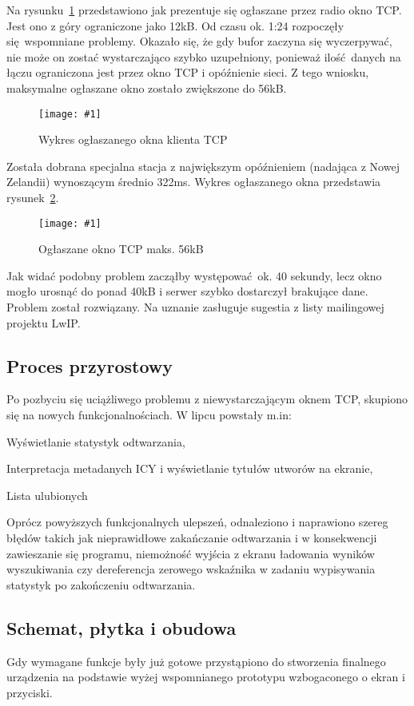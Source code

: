 \documentclass[polish]{aghengthesis}
\let\tempone\itemize
\let\temptwo\enditemize
\renewenvironment{itemize}{\tempone\setlength{\itemsep}{0cm}}{\temptwo}
\newcommand{\imgint}[4]{
	\begin{figure}[{#4}]
		\centering
		\texttt{[image: \#1]}
		\caption{#2}
		\label{#1}
	\end{figure}
}
\newcommand{\imgh}[3]{\imgint{#1}{#2}{#3}{H}}
\begin{document}
			Na rysunku~\ref{4/tcp_fail} przedstawiono jak prezentuje się ogłaszane przez radio okno TCP. Jest ono z góry ograniczone jako 12kB. Od czasu ok. 1:24 rozpoczęły się wspomniane problemy. Okazało się, że gdy bufor zaczyna się wyczerpywać, nie może on zostać wystarczająco szybko uzupełniony, ponieważ ilość danych na łączu ograniczona jest przez okno TCP i opóźnienie sieci. Z tego wniosku, maksymalne ogłaszane okno zostało zwiększone do 56kB.
			\imgh{4/tcp_fail}{Wykres ogłaszanego okna klienta TCP}{0.85}
			
			Została dobrana specjalna stacja z największym opóźnieniem (nadająca z Nowej Zelandii) wynoszącym średnio 322ms. Wykres ogłaszanego okna przedstawia rysunek~\ref{4/tcp_good}.
			
			\imgh{4/tcp_good}{Ogłaszane okno TCP maks. 56kB}{0.6}

			Jak widać podobny problem zacząłby występować ok. 40 sekundy, lecz okno mogło urosnąć do ponad 40kB i serwer szybko dostarczył brakujące dane. Problem został rozwiązany. Na uznanie zasługuje sugestia z listy mailingowej projektu LwIP. %
			
		\subsection{Proces przyrostowy}
			Po pozbyciu się uciążliwego problemu z niewystarczającym oknem TCP, skupiono się na nowych funkcjonalnościach. W lipcu powstały m.in:
			\begin{itemize}
				\item Wyświetlanie statystyk odtwarzania,
				\item Interpretacja metadanych ICY i wyświetlanie tytułów utworów na ekranie,
				\item Lista ulubionych
			\end{itemize}
			
			Oprócz powyższych funkcjonalnych ulepszeń, odnaleziono i naprawiono szereg błędów takich jak nieprawidłowe zakańczanie odtwarzania i w konsekwencji zawieszanie się programu, niemożność wyjścia z ekranu ładowania wyników wyszukiwania czy dereferencja zerowego wskaźnika w zadaniu wypisywania statystyk po zakończeniu odtwarzania.
			
		\subsection{Schemat, płytka i obudowa}
			Gdy wymagane funkcje były już gotowe przystąpiono do stworzenia finalnego urządzenia na podstawie wyżej wspomnianego prototypu wzbogaconego o ekran i przyciski.
			$ $\\
			
\end{document}
